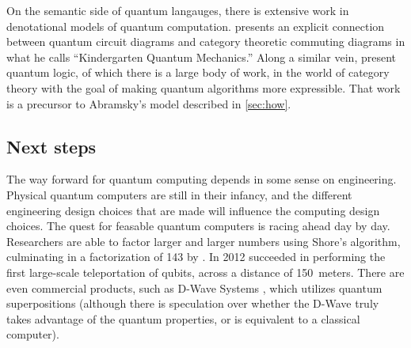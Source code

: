 On the semantic side of quantum langauges, there is extensive work in denotational 
models of quantum computation. \cite{coecke2005kindergarten} presents an
explicit connection between quantum circuit diagrams and category theoretic 
commuting diagrams in what he calls ``Kindergarten Quantum Mechanics.''
Along a similar vein, \cite{abramsky2006categorical} present quantum logic,
of which there is a large body of work, in the world of category theory with
the goal of making quantum algorithms more expressible. That work is a precursor
to Abramsky's model described in \cref{sec:how}.

\subsection{Next steps}

The way forward for quantum computing depends in some sense on engineering. 
Physical quantum computers are still in their infancy, and the different 
engineering design choices that are made will influence the computing design choices.
The quest for feasable quantum computers is racing ahead day by day.
Researchers are able to factor larger and larger numbers using Shore's algorithm,
culminating in a factorization of 143 by \cite{xu2012quantum}.
In 2012 \citet{bao2012quantum} succeeded in performing the first large-scale teleportation
of qubits, across a distance of 150~meters.
There are even commercial products, such as D-Wave Systems \citep{johnson2011quantum}, which utilizes
quantum superpositions (although there is speculation over whether the D-Wave truly takes
advantage of the quantum properties, or is equivalent to a classical computer).
